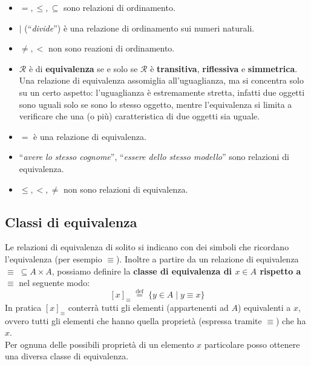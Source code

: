 \documentclass[
  a4paper,
]{article}
\providecommand{\tightlist}{%
  \setlength{\itemsep}{0pt}\setlength{\parskip}{0pt}}
\begin{document}
\begin{examplebox}[Esempi]

\begin{itemize}
\tightlist
\item
  \(=, \leq, \subseteq\) sono relazioni di ordinamento.
\item
  \(\mid\) (``\emph{divide}'') è una relazione di ordinamento sui numeri
  naturali.
\item
  \(\not = , <\) non sono reazioni di ordinamento.
\end{itemize}

\end{examplebox}

\begin{itemize}
\tightlist
\item
  \(\mathcal{R}\) è di \textbf{equivalenza} se e solo se \(\mathcal{R}\)
  è \textbf{transitiva}, \textbf{riflessiva} e \textbf{simmetrica}. Una
  relazione di equivalenza assomiglia all'uguaglianza, ma si concentra
  solo su un certo aspetto: l'uguaglianza è estremamente stretta,
  infatti due oggetti sono uguali solo se sono lo stesso oggetto, mentre
  l'equivalenza si limita a verificare che una (o più) caratteristica di
  due oggetti sia uguale.
\end{itemize}

\begin{examplebox}[Esempi]

\begin{itemize}
\tightlist
\item
  \(=\) è una relazione di equivalenza.
\item
  ``\emph{avere lo stesso cognome}'', ``\emph{essere dello stesso
  modello}'' sono relazioni di equivalenza.
\item
  \(\leq , < , \not =\) non sono relazioni di equivalenza.
\end{itemize}

\end{examplebox}

\hypertarget{classi-di-equivalenza}{%
\subsection{Classi di equivalenza}\label{classi-di-equivalenza}}

Le relazioni di equivalenza di solito si indicano con dei simboli che
ricordano l'equivalenza (per esempio \(\equiv\)). Inoltre a partire da
un relazione di equivalenza \(\equiv \; \subseteq A \times A\), possiamo
definire la \textbf{classe di equivalenza di \(x \in A\) rispetto a
\(\equiv\)} nel seguente modo: \[
[x]_\equiv \; \overset{\mathrm{def}}{=} \; \{y \in A \mid y \equiv x\}
\] In pratica \([x]_\equiv\) conterrà tutti gli elementi (appartenenti
ad \(A\)) equivalenti a \(x\), ovvero tutti gli elementi che hanno
quella proprietà (espressa tramite \(\equiv\)) che ha \(x\).\\
Per ognuna delle possibili proprietà di un elemento \(x\) particolare
posso ottenere una diversa classe di equivalenza.
\end{document}
